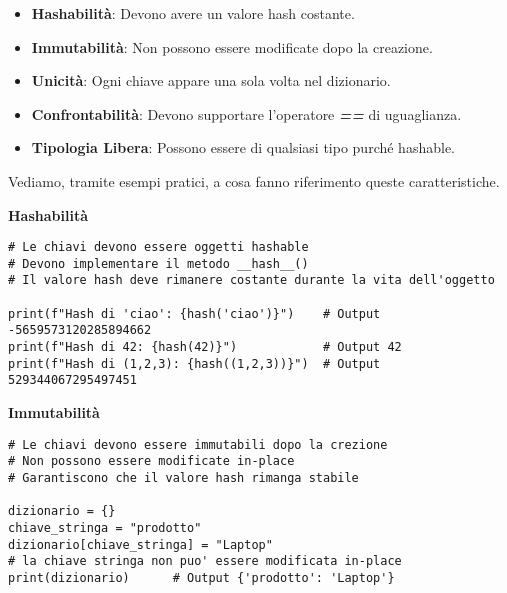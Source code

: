 \vspace{0.5cm}
\begin{tcolorbox}[colback=blue!5!white,colframe=blue!75!black,title=Caratteristiche principali delle Chiavi]
\begin{itemize}
    \item \textbf{Hashabilità}: Devono avere un valore hash costante.
    
    \item \textbf{Immutabilità}: Non possono essere modificate dopo la creazione.
    
    \item \textbf{Unicità}: Ogni chiave appare una sola volta nel dizionario.
    
    \item \textbf{Confrontabilità}: Devono supportare l'operatore \textit{\textbf{==}} di uguaglianza.
    
    \item \textbf{Tipologia Libera}: Possono essere di qualsiasi tipo purché hashable.
    
\end{itemize}
\end{tcolorbox}


Vediamo, tramite esempi pratici, a cosa fanno riferimento queste caratteristiche.
\vspace{0.5cm}

\textbf{Hashabilità}
\begin{lstlisting}
# Le chiavi devono essere oggetti hashable
# Devono implementare il metodo __hash__()
# Il valore hash deve rimanere costante durante la vita dell'oggetto

print(f"Hash di 'ciao': {hash('ciao')}")    # Output -5659573120285894662
print(f"Hash di 42: {hash(42)}")            # Output 42
print(f"Hash di (1,2,3): {hash((1,2,3))}")  # Output 529344067295497451
\end{lstlisting}

\vspace{0.5cm}
\textbf{Immutabilità}
\begin{lstlisting}
# Le chiavi devono essere immutabili dopo la crezione
# Non possono essere modificate in-place
# Garantiscono che il valore hash rimanga stabile

dizionario = {}
chiave_stringa = "prodotto"
dizionario[chiave_stringa] = "Laptop"
# la chiave stringa non puo' essere modificata in-place
print(dizionario)      # Output {'prodotto': 'Laptop'}
\end{lstlisting}

